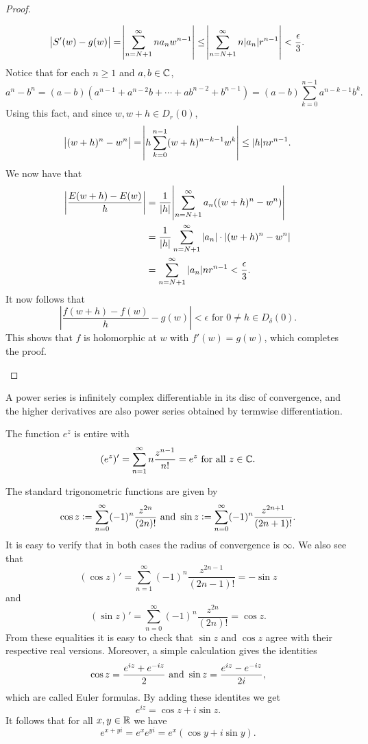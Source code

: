 \documentclass[11pt,a4paper]{article}
\begin{document}
\begin{proof}
\begin{enumerate}
    \[
      \abs{S'(w) - g(w)} =
      \abs{\sum_{n=N+1}^{\infty} n a_n w^{n - 1}} \le
      \abs{\sum_{n=N+1}^{\infty} n |a_n| r^{n - 1}} <
      \frac{\epsilon}{3}.
    \]
    Notice that for each $n \geq 1$ and $a,b \in \mathbb{C}$,
    \[
      a^n - b^n =
      (a - b)(a^{n - 1} + a^{n - 2} b + \cdots + a b^{n-2} + b^{n-1}) =
      (a - b) \sum_{k=0}^{n-1} a^{n-k-1} b^{k}.
    \]
    Using this fact, and since $w,w+h \in D_r(0)$,
    \[
      \abs{(w + h)^n - w^n} =
      \abs{h \sum_{k=0}^{n-1} (w + h)^{n-k-1} w^{k}} \le
      |h| n r^{n-1}.
    \]
    We now have that
    \begin{align*}
      \abs{\frac{E(w + h) - E(w)}{h}} 
        &= \frac{1}{|h|} \abs{\sum_{n=N+1}^{\infty} a_n((w+h)^{n}-w^n)} \\
        &= \frac{1}{|h|} \sum_{n=N+1}^{\infty} |a_n| \cdot |(w+h)^{n}-w^n| \\
        &= \sum_{n=N+1}^{\infty} |a_n| n r^{n-1} < \frac{\epsilon}{3}.
    \end{align*}
    It now follows that
    \[
      \left|
      \frac{f(w + h) - f(w)}{h} - g(w)
      \right| < \epsilon \text{ for } 0 \neq h \in D_{\delta}(0).
    \]
    This shows that $f$ is holomorphic at $w$ with $f'(w) = g(w)$, which
    completes the proof.
\end{enumerate}
\end{proof}

\begin{corollary}
  A power series is infinitely complex differentiable in its disc of
  convergence, and the higher derivatives are also power series obtained 
  by termwise differentiation.
\end{corollary}

\begin{example}
  The function $e^z$ is entire with
  \[
    (e^z)' = \sum_{n=1}^{\infty} n \frac{z^{n-1}}{n!} = e^z
    \text{ for all } z \in \mathbb{C}.
  \]
\end{example}

\begin{example}
  The standard trigonometric functions are given by
  \[
    \cos z := \sum_{n=0}^{\infty} (-1)^n \frac{z^{2n}}{(2n)!} \text{ and }
    \sin z := \sum_{n=0}^{\infty} (-1)^n \frac{z^{2n+1}}{(2n+1)!}.
  \]
  It is easy to verify that in both cases the radius of convergence
  is $\infty$.
  We also see that
  \[
    (\cos z)' = \sum_{n=1}^{\infty} (-1)^n \frac{z^{2n-1}}{(2n-1)!} = - \sin z
  \]
  and
  \[
    (\sin z)' = \sum_{n=0}^{\infty} (-1)^n \frac{z^{2n}}{(2n)!} = \cos z.
  \]
  From these equalities it is easy to check that $\sin z$ and $\cos z$ agree
  with their respective real versions.
  Moreover, a simple calculation gives the identities
  \[
    \cos z = \frac{e^{iz} + e^{-iz}}{2} \text{ and }
    \sin z = \frac{e^{iz} - e^{-iz}}{2 i},
  \]
  which are called Euler formulas.
  By adding these identites we get
  \[
    e^{iz} = \cos z + i \sin z.
  \]
  It follows that for all $x,y \in \mathbb{R}$ we have
  \[
    e^{x + y i} = e^x e^{y i} = e^x (\cos y + i \sin y).
  \]
\end{example}
\end{document}
